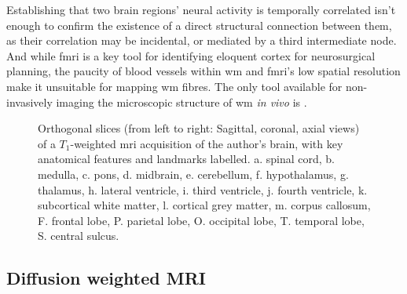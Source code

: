 Establishing that two brain regions' neural activity is temporally correlated isn't enough to confirm the existence of a direct structural connection between them, as their correlation may be incidental, or mediated by a third intermediate node.
And while \gls{fmri} is a key tool for identifying eloquent cortex for neurosurgical planning, the paucity of blood vessels within \gls{wm} and \gls{fmri}'s low spatial resolution make it unsuitable for mapping \gls{wm} fibres.
The only tool available for non-invasively imaging the microscopic structure of \gls{wm} \textit{in vivo} is .

\begin{figure}[hbt!]
  
  \caption{Orthogonal slices (from left to right: Sagittal, coronal, axial views) of a $T_1$-weighted \gls{mri} acquisition of the author's brain, with key anatomical features and landmarks labelled.  a. spinal cord, b. medulla, c. pons, d. midbrain, e. cerebellum, f. hypothalamus, g. thalamus, h. lateral ventricle, i. third ventricle, j. fourth ventricle, k. subcortical white matter, l. cortical grey matter, m. corpus callosum, F. frontal lobe, P. parietal lobe, O. occipital lobe, T. temporal lobe, S. central sulcus.}
  \label{fig:ortho}
\end{figure}

\subsection{Diffusion weighted MRI}\label{sec:dmri}


